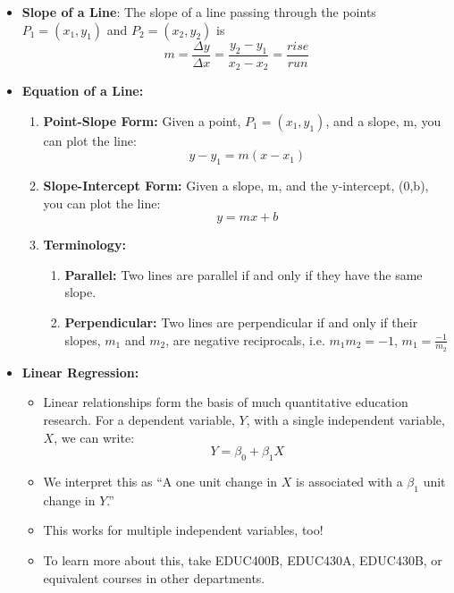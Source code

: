 \documentclass[11pt]{article}
\theoremstyle{definition}
\theoremstyle{remark}
\begin{document}
\begin{itemize}

\item \textbf{Slope of a Line}: The slope of a line passing through the points $P_1 = (x_1, y_1)$ and $P_2 = (x_2, y_2) $ is 
\begin{equation*}
m=\displaystyle \frac{\Delta y}{\Delta x}  = \displaystyle \frac{y_2 - y_1}{ x_2 - x_2} = \displaystyle \frac{rise}{run}
\end{equation*}
\item\textbf{Equation of a Line:}
\begin{enumerate}
\item \textbf{Point-Slope Form:} Given a point, $P_1 = (x_1, y_1)$, and a slope, m, you can plot the line:
\begin{equation*}
y-y_1 = m(x - x_1)
\end{equation*}
\item \textbf{Slope-Intercept Form:} Given a slope, m, and the y-intercept, (0,b), you can plot the line:
\begin{equation*}
y = mx + b
\end{equation*}

\item \textbf{Terminology:}
\begin{enumerate}
\item \textbf{Parallel:} Two lines are parallel if and only if they have the same slope.
\item \textbf{Perpendicular:} Two lines are perpendicular if and only if their slopes, $m_1$ and $m_2$, are negative reciprocals, i.e. $m_1m_2 = -1$, $m_1 =\frac{-1}{m_2}$
\end{enumerate}
\end{enumerate}

\item \textbf{Linear Regression:}
\begin{itemize}
    \item Linear relationships form the basis of much quantitative education research. For a dependent variable, $Y$, with a single independent variable, $X$, we can write:
    $$ Y = \beta_0 + \beta_1 X$$
    \item We interpret this as ``A one unit change in $X$ is associated with a $\beta_1$ unit change in $Y$.''
    \item This works for multiple independent variables, too!
    \item To learn more about this, take EDUC400B, EDUC430A, EDUC430B, or equivalent courses in other departments.
\end{itemize}


\end{itemize}
\end{document}
